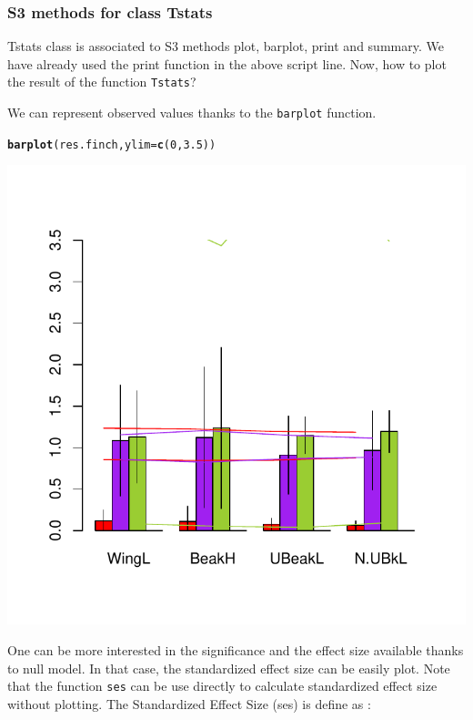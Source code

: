 \documentclass[12pt]{article}\usepackage[]{graphicx}\usepackage[]{color}
\makeatletter
\def\maxwidth{ %
  \ifdim\Gin@nat@width>\linewidth
    \linewidth
  \else
    \Gin@nat@width
  \fi
}
\newcommand{\hlnum}[1]{\textcolor[rgb]{0.686,0.059,0.569}{#1}}%
\newcommand{\hlstd}[1]{\textcolor[rgb]{0.345,0.345,0.345}{#1}}%
\newcommand{\hlkwc}[1]{\textcolor[rgb]{0.333,0.667,0.333}{#1}}%
\newcommand{\hlkwd}[1]{\textcolor[rgb]{0.737,0.353,0.396}{\textbf{#1}}}%
\newenvironment{kframe}{%
 \def\at@end@of@kframe{}%
 \ifinner\ifhmode%
  \def\at@end@of@kframe{\end{minipage}}%
  \begin{minipage}{\columnwidth}%
 \fi\fi%
 \def\FrameCommand##1{\hskip\@totalleftmargin \hskip-\fboxsep
 \colorbox{shadecolor}{##1}\hskip-\fboxsep
     \hskip-\linewidth \hskip-\@totalleftmargin \hskip\columnwidth}%
 \MakeFramed {\advance\hsize-\width
   \@totalleftmargin\z@ \linewidth\hsize
   \@setminipage}}%
 {\par\unskip\endMakeFramed%
 \at@end@of@kframe}
\newenvironment{knitrout}{}{} %
\makeatother
\begin{document}
\subsubsection{S3 methods for class Tstats}
Tstats class is associated to S3 methods plot, barplot, print and summary. We have already used the print function in the above script line. Now, how to plot the result of the function \texttt{Tstats}?

We can represent observed values thanks to the \texttt{barplot} function.
\begin{knitrout}
\color{fgcolor}\begin{kframe}
\begin{alltt}
\hlkwd{barplot}\hlstd{(res.finch,} \hlkwc{ylim} \hlstd{=} \hlkwd{c}\hlstd{(}\hlnum{0}\hlstd{,}\hlnum{3.5}\hlstd{))}
\end{alltt}
\end{kframe}

{\centering \includegraphics[width=\maxwidth]{figure/unnamed-chunk-33-1} 

}



\end{knitrout}

One can be more interested in the significance and the effect size available thanks to null model. In that case, the standardized effect size can be easily plot. Note that the function \texttt{ses} can be use directly to calculate standardized effect size without plotting. The Standardized Effect Size (ses) is define as : 
\end{document}
